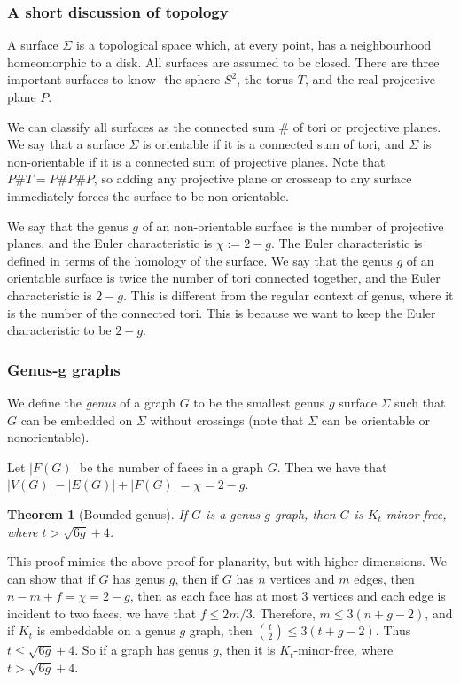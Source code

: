 \documentclass[]{report}
\newtheorem{theorem}{Theorem}
\theoremstyle{definition}
\numberwithin{theorem}{section}
\numberwithin{equation}{section}
\begin{document}
\subsubsection{A short discussion of topology}\label{sssec:topology}
A surface $\Sigma$ is a topological space which, at every point, has a neighbourhood homeomorphic to a disk. All surfaces are assumed to be closed. There are three important surfaces to know- the sphere $S^2$, the torus $T$, and the real projective plane $P$.

We can classify all surfaces as the connected sum $\# $ of tori or projective planes. We say that a surface $\Sigma$ is orientable if it is a connected sum of tori, and $\Sigma$ is non-orientable if it is a connected sum of projective planes. Note that $P \# T = P \# P \# P$, so adding any projective plane or crosscap to any surface immediately forces the surface to be non-orientable. 

We say that the genus $g$ of an non-orientable surface is the number of projective planes, and the Euler characteristic is $\chi := 2 - g$. The Euler characteristic is defined in terms of the homology of the surface.
We say that the genus $g$ of an orientable surface is twice the number of tori connected together, and the Euler characteristic is $2 - g$. This is different from the regular context of genus, where it is the number of the connected tori. This is because we want to keep the Euler characteristic to be $2-g$. 

\subsubsection{Genus-g graphs}\label{sssec:Graph_genus}

We define the \textit{genus} of a graph $G$ to be the smallest genus $g$ surface $\Sigma$ such that $G$ can be embedded on $\Sigma$ without crossings (note that $\Sigma$ can be orientable or nonorientable).

 Let $|F(G)|$ be the number of faces in a graph $G$. Then we have that $|V(G)| - |E(G)| + |F(G)| = \chi = 2 - g$. 

\begin{theorem}[Bounded genus]\label{thm:bounded_genus_kt_free}
	If $G$ is a genus $g$ graph, then $G$ is $K_t$-minor free, where $t > \sqrt{6g} + 4$. 
\end{theorem}
This proof mimics the above proof for planarity, but with higher dimensions. 
We can show that if $G$ has genus $g$, then if $G$ has $n$ vertices and $m$ edges, then $n - m + f = \chi = 2-g$, then as each face has at most 3 vertices and each edge is incident to two faces, we have that $f \leq 2m/3$. Therefore, $m \leq 3(n + g - 2)$, and if $K_t$ is embeddable on a genus $g$ graph, then $\binom{t}{2} \leq 3 (t + g - 2)$. Thus $t \leq \sqrt{6g} + 4$. So if a graph has genus $g$, then it is $K_t$-minor-free, where $t > \sqrt{6g} + 4$. 
\end{document}

